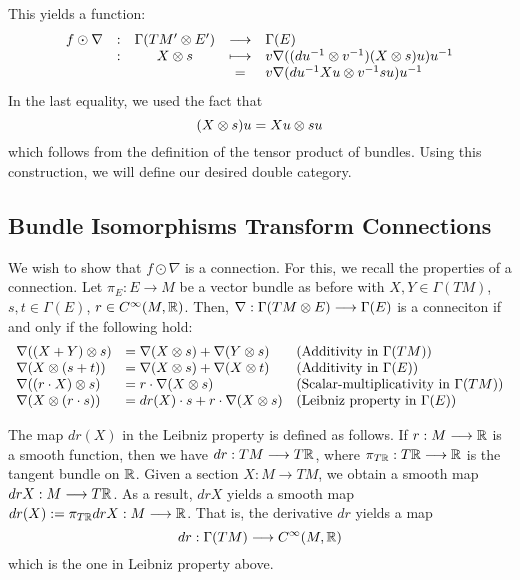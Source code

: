 \documentclass[./Thick_TQFTs_and_Quantum_Information.tex]{subfiles}
\begin{document}
This yields a function:
\[\begin{array}{ccccl}
f \odot \nabla
&:& \Gamma(TM' \otimes E') &\stackrel{}{\longrightarrow}& \Gamma(E) \\
&:& X \otimes s &\longmapsto&
    v\nabla((du^{-1} \otimes v^{-1})(X \otimes s)u)u^{-1} \\
& &             & = & v\nabla(du^{-1}Xu \otimes v^{-1}su)u^{-1}
\end{array}\]
In the last equality, we used the fact that
\[
  (X \otimes s)u = Xu \otimes su
\]
which follows from the definition of the tensor product of bundles. Using this
construction, we will define our desired double category.

\subsection{Bundle Isomorphisms Transform Connections}

We wish to show that $f \odot \nabla$ is a connection. For this, we recall the
properties of a connection. Let $\pi_E : E \to M$ be a vector bundle as before
with $X, Y \in \Gamma(TM)$, $s, t \in \Gamma(E)$, $r \in C^{\infty}(M, \mathbb{R})$.
Then, $\nabla : \Gamma(TM \otimes E) \stackrel{}{\longrightarrow} \Gamma(E)$ is a conneciton if and only
if the following hold:
\[\begin{array}{lll}
\nabla((X + Y) \otimes s) &= \nabla(X \otimes s) + \nabla(Y \otimes s)
  & (\text{Additivity in $\Gamma(TM)$}) \\
\nabla(X \otimes (s + t)) &= \nabla(X \otimes s) + \nabla(X \otimes t)
  & (\text{Additivity in $\Gamma(E)$}) \\
\nabla((r \cdot X) \otimes s) &= r \cdot \nabla(X \otimes s)
  & (\text{Scalar-multiplicativity in $\Gamma(TM)$}) \\
\nabla(X \otimes (r \cdot s)) &= dr(X) \cdot s + r \cdot \nabla(X \otimes s)
  & (\text{Leibniz property in $\Gamma(E)$}) \\
\end{array}\]
\begin{rmk}
The map $dr(X)$ in the Leibniz property is defined as follows. If $r : M \stackrel{}{\longrightarrow} \mathbb{R}$
is a smooth function, then we have $dr : TM \stackrel{}{\longrightarrow} T\mathbb{R}$, where
$\pi_{T\mathbb{R}} : T\mathbb{R} \stackrel{}{\longrightarrow} \mathbb{R}$ is the tangent bundle on $\mathbb{R}$. Given a section
$X : M \to TM$, we obtain a smooth map $drX : M \stackrel{}{\longrightarrow} T\mathbb{R}$. As a result, $drX$
yields a smooth map $dr(X) := \pi_{T\mathbb{R}}drX : M \stackrel{}{\longrightarrow} \mathbb{R}$. That is, the derivative
$dr$ yields a map
\[
  dr : \Gamma(TM) \stackrel{}{\longrightarrow} C^{\infty}(M, \mathbb{R})
\]
which is the one in Leibniz property above.
\end{rmk}
\end{document}
